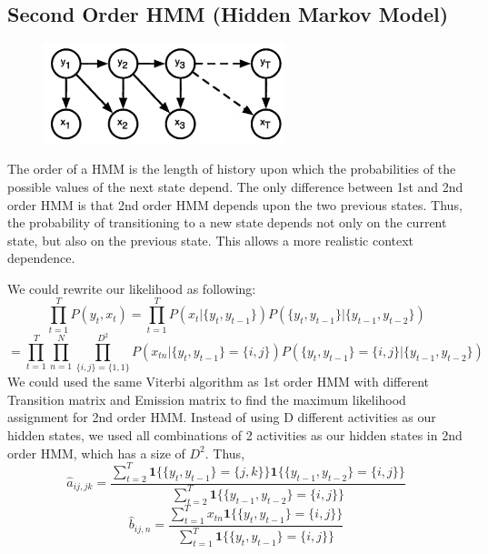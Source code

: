 \documentclass[10pt,letter]{article}
\numberwithin{equation}{section} %
\numberwithin{figure}{section} %
\numberwithin{table}{section} %
\begin{document}
\subsection{Second Order HMM (Hidden Markov Model)}

\begin{figure}[h]
    \centering
\includegraphics[width=7cm]{2hmm}
\end{figure}

The order of a HMM is the length of history upon which the probabilities of the possible values of the next state depend. The only difference between 1st and 2nd order HMM is that 2nd order HMM depends upon the two previous states. Thus, the probability of transitioning to a new state depends not only on the current state, but also on the previous state. This allows a more realistic context dependence.

We could rewrite our likelihood as following:
$$ \prod_{t=1}^{T} P(y_t, x_t) = \prod_{t=1}^T P(x_t|\{y_t, y_{t-1}\})P(\{y_t,y_{t-1}\}|\{y_{t-1},y_{t-2}\})$$
$$=\prod_{t=1}^T\prod_{n=1}^N\prod_{\{i,j\}=\{1,1\}}^{D^2} P(x_{tn}|\{y_t, y_{t-1}\} = \{i,j\})P(\{y_t, y_{t-1}\} = \{i,j\}|\{y_{t-1}, y_{t-2}\}) $$
We could used the same Viterbi algorithm as 1st order HMM with different Transition matrix and Emission matrix to find the maximum likelihood assignment for 2nd order HMM. 
Instead of using D different activities as our hidden states, we used all combinations of 2 activities as our hidden states in 2nd order HMM, which has a size of $D^2$. Thus,
$$\hat{a}_{ij, jk} = \frac{\sum_{t=2}^T \mathbf{1}\{\{y_t,y_{t-1}\}=\{j,k\}\}\mathbf{1}\{\{y_{t-1},y_{t-2}\}=\{i,j\}\}}{\sum_{t=2}^T \mathbf{1}\{\{y_{t-1},y_{t-2}\}=\{i,j\}\}}$$
$$\hat{b}_{ij,n} = \frac{\sum_{t=1}^T x_{tn}\mathbf{1}\{\{y_t,y_{t-1}\}=\{i, j\}\}}{\sum_{t=1}^T \mathbf{1}\{\{y_t,y_{t-1}\}=\{i, j\}\}}$$
\end{document}
